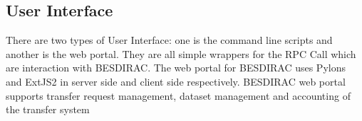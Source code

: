 \subsection{User Interface}
There are two types of User Interface: one is the command line scripts and 
another is the web portal. 
They are all simple wrappers for the RPC Call which are interaction
with BESDIRAC.
The web portal for BESDIRAC uses Pylons and ExtJS2 in server side and
client side respectively\cite{bib:webportal}. BESDIRAC web portal supports
transfer request management, dataset management and  
accounting of the transfer system
